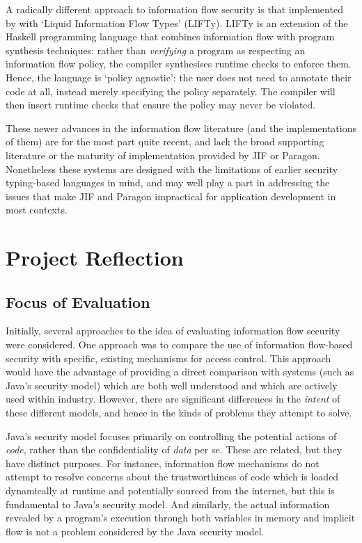 A radically different approach to information flow security is that implemented by \citeauthor{polikarpova2016lifty} \cite{polikarpova2016lifty} with `Liquid Information Flow Types' (LIFTy). LIFTy is an extension of the Haskell programming language that combines information flow with program synthesis techniques: rather than \textit{verifying} a program as respecting an information flow policy, the compiler synthesises runtime checks to enforce them. Hence, the language is `policy agnostic': the user does not need to annotate their code at all, instead merely specifying the policy separately. The compiler will then insert runtime checks that ensure the policy may never be violated.

These newer advances in the information flow literature (and the implementations of them) are for the most part quite recent, and lack the broad supporting literature or the maturity of implementation provided by JIF or Paragon. Nonetheless these systems are designed with the limitations of earlier security typing-based languages in mind, and may well play a part in addressing the issues that make JIF and Paragon impractical for application development in most contexts.

\section{Project Reflection}


\subsection{Focus of Evaluation}

Initially, several approaches to the idea of evaluating information flow security were considered. One approach was to compare the use of information flow-based security with specific, existing mechanisms for access control. This approach would have the advantage of providing a direct comparison with systems (such as Java's security model) which are both well understood and which are actively used within industry. However, there are significant differences in the \textit{intent} of these different models, and hence in the kinds of problems they attempt to solve.

Java's security model focuses primarily on controlling the potential actions of \textit{code}, rather than the confidentiality of \textit{data} per se. These are related, but they have distinct purposes. For instance, information flow mechanisms do not attempt to resolve concerns about the trustworthiness of code which is loaded dynamically at runtime and potentially sourced from the internet, but this is fundamental to Java's security model. And similarly, the actual information revealed by a program's execution through both variables in memory and implicit flow is not a problem considered by the Java security model.

